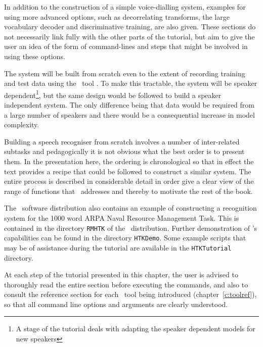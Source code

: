 In addition to the construction of a simple voice-dialling system, examples for
using more advanced options, such as decorrelating transforms, the large
vocabulary decoder and discriminative training, are also given. These sections
do not necessarily link fully with the other parts of the tutorial, but aim to
give the user an idea of the form of command-lines and steps that might be
involved in using these options.

The system will be built from scratch even to the extent of recording training
and test data using the \HTK\ tool .  To make this tractable, the
system will be speaker dependent\footnote{A stage of the tutorial deals 
with adapting the speaker dependent models for new speakers}, but the same design 
would be followed to build a speaker independent system.  The only difference being 
that data would be required from a large number of speakers and there would 
be a consequential increase in model complexity. 

Building a speech recogniser from scratch involves a number of inter-related
subtasks and pedagogically it is not obvious what the best order is to present
them. In the presentation here, the ordering is chronological so that in effect
the text provides a recipe that could be followed to construct a similar
system.  The entire process is described in considerable detail in order give a
clear view of the range of functions that \HTK\ addresses and thereby to
motivate the rest of the book.

The \HTK\ software distribution also contains an example of constructing a
recognition system for the 1000 word ARPA Naval Resource Management Task. This
is contained in the directory \texttt{RMHTK} of the \HTK\ distribution.
Further demonstration of \HTK's capabilities can be found in the directory 
\texttt{HTKDemo}. Some example scripts that may be of assistance during the 
tutorial are available in the \texttt{HTKTutorial} directory.

At each step of the tutorial presented in this chapter, the user is advised to
thoroughly read the entire section before executing the commands, and also to
consult the reference section for each \HTK\ tool being introduced
(chapter~\ref{c:toolref}), so that all command line options and arguments are
clearly understood.


